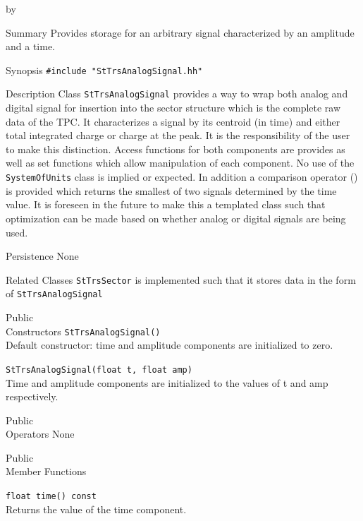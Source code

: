 \documentclass[twoside]{article}
\newcommand{\comp}[1]{\texttt{#1}}%
\newcommand{\entrylabel}[1]{\mbox{\textbf{{#1}}}\hfil}%
\newenvironment{entry}
{\begin{list}{}%
    {\renewcommand{\makelabel}{\entrylabel}%
     \setlength{\labelwidth}{90pt}%
     \setlength{\leftmargin}{\labelwidth}
     \advance\leftmargin by \labelsep%
      }%
    }%
  {\end{list}}
\newcommand{\Entrylabel}[1]%
{\raisebox{0pt}[1ex][0pt]{\makebox[\labelwidth][l]%
    {\parbox[t]{\labelwidth}{\hspace{0pt}\textbf{{#1}}}}}}
\newenvironment{Entry}%
{\renewcommand{\entrylabel}{\Entrylabel}\begin{entry}}%
  {\end{entry}}
\begin{document}
\begin{Entry}
\item[Summary]
  Provides storage for an arbitrary signal characterized by
  an amplitude and a time.


\item[Synopsis]
  \verb+#include "StTrsAnalogSignal.hh"+\\

\item[Description] 
  Class \comp{StTrsAnalogSignal} provides a way to wrap both analog
  and digital signal for insertion into the sector structure which
  is the complete raw data of the TPC.  It characterizes a signal
  by its centroid (in time) and either total integrated charge or
  charge at the peak.  It is the responsibility of the user to make
  this distinction.  Access functions for both components are provides
  as well as set functions which allow manipulation of each component.
  No use of the \comp{SystemOfUnits} class is implied or expected.
  In addition a comparison operator () is provided which returns the smallest
  of two signals determined by the time value.
  It is foreseen in the future to make this a templated
  class such that optimization can be made based on whether analog or
  digital signals are being used.

\item[Persistence]
   None

\item[Related Classes]
   \comp{StTrsSector} is implemented such that it stores data in the form
   of \comp{StTrsAnalogSignal}

\item[Public \\ Constructors]
   \verb+StTrsAnalogSignal()+\\
   Default constructor: time and amplitude components are initialized to zero.

   \verb+StTrsAnalogSignal(float t, float amp)+\\
   Time and amplitude components are initialized to the values of t and amp
   respectively.
   
\item[Public \\ Operators]
   None

\item[Public \\ Member Functions]

  \verb+float time() const+\\
  Returns the value of the time component.


\end{Entry}
\end{document}
